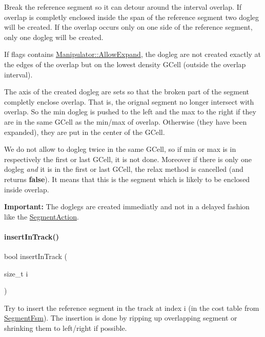 Break the reference segment so it can detour around the interval {\ttfamily overlap}. If {\ttfamily overlap} is completly enclosed inside the span of the reference segment two dogleg will be created. If the overlap occurs only on one side of the reference segment, only one dogleg will be created.

If {\ttfamily flags} contains \mbox{\hyperlink{classKite_1_1Manipulator_a2af2ad6b6441614038caf59d04b3b217a41880b9f6652400677e21c8681f97675}{Manipulator\+::\+Allow\+Expand}}, the dogleg are not created exactly at the edges of the overlap but on the lowest density G\+Cell (outside the overlap interval).

The axis of the created dogleg are sets so that the broken part of the segment completly enclose {\ttfamily overlap}. That is, the orignal segment no longer intersect with {\ttfamily overlap}. So the min dogleg is pushed to the left and the max to the right if they are in the same G\+Cell as the min/max of {\ttfamily overlap}. Otherwise (they have been expanded), they are put in the center of the G\+Cell.

We do not allow to dogleg twice in the same G\+Cell, so if min or max is in respectively the first or last G\+Cell, it is not done. Moreover if there is only one dogleg {\itshape and} it is in the first or last G\+Cell, the relax method is cancelled (and returns {\bfseries false}). It means that this is the segment which is likely to be enclosed inside {\ttfamily overlap}.

{\bfseries Important\+:} The doglegs are created immediatly and not in a delayed fashion like the \mbox{\hyperlink{classKite_1_1SegmentAction}{Segment\+Action}}.

    \mbox{\label{classKite_1_1Manipulator_a7140b507da2cab137d968a037bed19df}} 
\paragraph{\texorpdfstring{insert\+In\+Track()}{insertInTrack()}}
{\footnotesize\ttfamily bool insert\+In\+Track (\begin{DoxyParamCaption}\item[{size\+\_\+t}]{i }\end{DoxyParamCaption})}

Try to insert the reference segment in the track at index {\ttfamily i} (in the cost table from \mbox{\hyperlink{classKite_1_1SegmentFsm}{Segment\+Fsm}}). The insertion is done by ripping up overlapping segment or shrinking them to left/right if possible.

